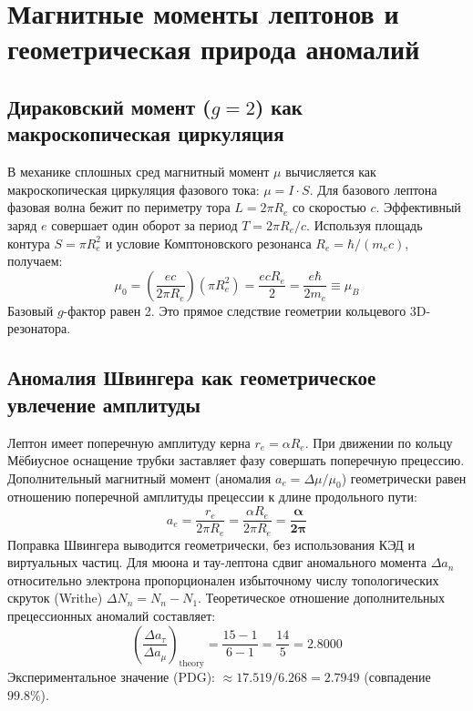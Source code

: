 \documentclass[12pt,a4paper]{article}
\begin{document}
	\section{Магнитные моменты лептонов и геометрическая природа аномалий}
	
	\subsection{Дираковский момент ($g=2$) как макроскопическая циркуляция}
	В механике сплошных сред магнитный момент $\mu$ вычисляется как макроскопическая циркуляция фазового тока: $\mu = I \cdot S$. Для базового лептона фазовая волна бежит по периметру тора $L = 2\pi R_e$ со скоростью $c$. Эффективный заряд $e$ совершает один оборот за период $T = 2\pi R_e / c$. 
	Используя площадь контура $S = \pi R_e^2$ и условие Комптоновского резонанса $R_e = \hbar / (m_e c)$, получаем:
	\begin{equation}
		\mu_0 = \left( \frac{e c}{2\pi R_e} \right) (\pi R_e^2) = \frac{e c R_e}{2} = \frac{e \hbar}{2 m_e} \equiv \mu_B
	\end{equation}
	Базовый $g$-фактор равен 2. Это прямое следствие геометрии кольцевого 3D-резонатора.
	
	\subsection{Аномалия Швингера как геометрическое увлечение амплитуды}
	Лептон имеет поперечную амплитуду керна $r_e = \alpha R_e$. При движении по кольцу Мёбиусное оснащение трубки заставляет фазу совершать поперечную прецессию. Дополнительный магнитный момент (аномалия $a_e = \Delta \mu / \mu_0$) геометрически равен отношению поперечной амплитуды прецессии к длине продольного пути:
	\begin{equation}
		a_e = \frac{r_e}{2\pi R_e} = \frac{\alpha R_e}{2\pi R_e} = \mathbf{\frac{\alpha}{2\pi}}
	\end{equation}
	Поправка Швингера выводится геометрически, без использования КЭД и виртуальных частиц.
	Для мюона и тау-лептона сдвиг аномального момента $\Delta a_n$ относительно электрона пропорционален избыточному числу топологических скруток (Writhe) $\Delta N_n = N_n - N_1$.
	Теоретическое отношение дополнительных прецессионных аномалий составляет:
	\begin{equation}
		\left( \frac{\Delta a_\tau}{\Delta a_\mu} \right)_{\text{theory}} = \frac{15 - 1}{6 - 1} = \frac{14}{5} = \mathbf{2.8000}
	\end{equation}
	Экспериментальное значение (PDG): $\approx 17.519 / 6.268 = \mathbf{2.7949}$ (совпадение $99.8\%$).
	
\end{document}
